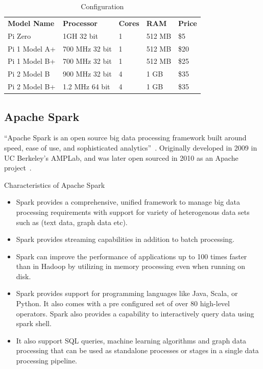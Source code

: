 \begin{table}[]
	\centering \caption{Configuration}\label{t:Different Pi Models}
        \begin{tabular}{lllll} 
        \textbf{Model Name} & \textbf{Processor} & \textbf{Cores} & \textbf{RAM}& \textbf{Price}
        \\ Pi Zero & 1GH 32 bit & 1 & 512 MB & \$5
        \\ Pi 1 Model A+ & 700 MHz 32 bit & 1  & 512 MB & \$20
        \\ Pi 1 Model B+ & 700 MHz 32 bit & 1 & 512 MB & \$25
        \\ Pi 2 Model B & 900 MHz 32 bit & 4 & 1 GB & \$35
        \\ Pi 2 Model B+ & 1.2 MHz 64 bit & 4 & 1 GB & \$35        
        \\
	\end{tabular}
\end{table}

\subsection{Apache Spark}

``Apache Spark is an open source big data processing framework built
around speed, ease of use, and sophisticated
analytics''~\cite{hid-sp18-510-spark}. Originally developed in 2009 in
UC Berkeley’s AMPLab, and was later open sourced in 2010 as an Apache
project~\cite{hid-sp18-510-spark}.

Characteristics of Apache Spark

\begin{itemize}
\item Spark provides a comprehensive, unified framework to manage big
  data processing requirements with support for variety of
  heterogenous data sets such as (text data, graph data etc).
\item Spark provides streaming capabilities in addition to batch
  processing.
\item Spark can improve the performance of applications up to 100
  times faster than in Hadoop by utilizing in memory processing even
  when running on disk.
\item Spark provides support for programming languages like Java,
  Scala, or Python. It also comes with a pre configured set of over 80
  high-level operators. Spark also provides a capability to
  interactively query data using spark shell.
\item It also support SQL queries, machine learning algorithms and
  graph data processing that can be used as standalone processes or
  stages in a single data processing pipeline.
\end{itemize}


